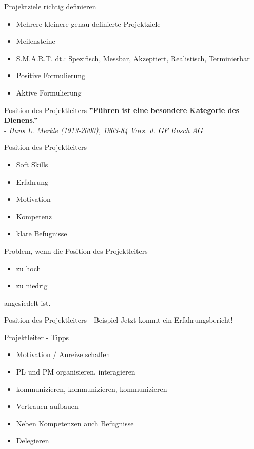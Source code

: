 \documentclass[12pt]{beamer}
\begin{document}
	\begin{frame}{Projektziele richtig definieren}
		\begin{itemize}
			\item{Mehrere kleinere genau definierte Projektziele}
			\item{Meilensteine}
			\item{S.M.A.R.T. dt.: Spezifisch, Messbar, Akzeptiert, Realistisch, Terminierbar}
			\item{Positive Formulierung}
			\item{Aktive Formulierung}
		\end{itemize}
	\end{frame}


	\begin{frame}{Position des Projektleiters}
		\textbf{''Führen ist eine besondere Kategorie des Dienens.''}\\
		 - \textit{Hans L. Merkle (1913-2000), 1963-84 Vors. d. GF Bosch AG}
	\end{frame}

	\begin{frame}{Position des Projektleiters}
		\begin{itemize}
			\item{Soft Skills}
			\item{Erfahrung}
			\item{Motivation}
			\item{Kompetenz}
			\item{klare Befugnisse}
		\end{itemize}

		Problem, wenn die Position des Projektleiters
		\begin{itemize}
			\item{zu hoch}
			\item{zu niedrig} 
		\end{itemize}
		angesiedelt ist.
		
	\end{frame}

	\begin{frame}{Position des Projektleiters - Beispiel}
		Jetzt kommt ein Erfahrungsbericht!
	\end{frame}

	\begin{frame}{Projektleiter - Tipps}
		\begin{itemize}
			\item{Motivation / Anreize schaffen}
			\item{PL und PM organisieren, interagieren}
			\item{kommunizieren, kommunizieren, kommunizieren}
			\item{Vertrauen aufbauen}
			\item{Neben Kompetenzen auch Befugnisse}
			\item{Delegieren}
		\end{itemize}
	\end{frame}
\end{document}

